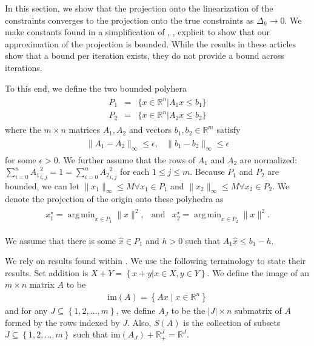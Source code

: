 \documentclass{article}
\newenvironment{comment}
  {\par\medskip
   \color{red}%
   \begin{framed}
   \textbf{Comment: }\ignorespaces}
 {\end{framed}
  \medskip}
\theoremstyle{case}
\numberwithin{theorem}{subsection}
\DeclareMathOperator*{\argmin}{arg\,min}
\newcommand{\dk}{\Delta_k}
\newcommand{\reals}{\mathbb R}
\newcommand{\Rm}{\mathbb R^m}
\newcommand{\Rn}{\mathbb R^n}
\newcommand{\image}{{\textrm{im}}}
\begin{document}
In this section, we show that the projection onto the linearization of the constraints converges to the projection onto the true constraints as $\dk \to 0$.
We make constants found in a simplification of \cite{dummy:hoffman}, \cite{dummy:continuity_of_inverse}, \cite{dummy:perturbations} 
explicit to show that our approximation of the projection is bounded.
While the results in these articles show that a bound per iteration exists, they do not provide a bound across iterations.

To this end, we define the two bounded polyhera
\begin{align*}
\begin{array}{ccc}
P_1 &=& \{ x \in \Rn | A_1x\le b_1 \} \\
P_2 &=& \{ x \in \Rn | A_2x\le b_2 \}
\end{array}
\end{align*}
where the $m\times n$ matrices $A_1, A_2$ and vectors $b_1, b_2 \in \Rm$ satisfy
\begin{align*}
\begin{array}{cc}
\|A_1 - A_2\|_{\infty} \le \epsilon, & \|b_1 - b_2\|_{\infty} \le \epsilon
\end{array}
\end{align*}
for some $\epsilon > 0$.
We further assume that the rows of $A_1$ and $A_2$ are normalized: $\sum_{i = 0}^n{A_1}_{i,j}^2 = 1 = \sum_{i = 0}^n{A_2}_{i,j}^2$ for each $1 \le j \le m$.
Because $P_1$ and $P_2$ are bounded, we can let $\|x_1\|_{\infty} \le M \forall x_1 \in P_1$ and $\|x_2\|_{\infty} \le M \forall x_2 \in P_2$.
We denote the projection of the origin onto these polyhedra as
\begin{align*}
\begin{array}{ccc}
x_1^{\star} = \argmin_{x\in P_1}\|x\|^2, &\textrm{and} & x_2^{\star} = \argmin_{x\in P_2}\|x\|^2.
\end{array}
\end{align*}

We assume that there is some $\hat x \in P_1$ and $h > 0$ such that $A_1 \hat x \le b_1 - h$.

We rely on results found within \cite{pena2020new}.
We use the following terminology to state their results.
Set addition is $X + Y = \left\{x + y | x \in X, y \in Y\right\}$.
We define the image of an $m\times n$ matrix $A$ to be
\begin{align*}
\image(A) = \left\{Ax \;|\; x \in \Rn \right\}
\end{align*}
and for any $J \subseteq \left\{1, 2, \ldots, m \right\}$, we define $A_J$ to be the $|J| \times n$ submatrix of $A$ 
formed by the rows indexed by $J$.
Also, $S(A)$ is the collection of subsets $J \subseteq \left\{1, 2, \ldots, m \right\}$ such that 
$\image(A_J) + \reals_+^J = \reals^J$.
\end{document}
